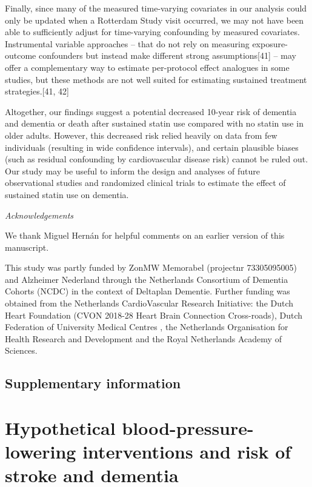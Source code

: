 \documentclass[
]{book}
\begin{document}
Finally, since many of the measured time-varying covariates in our analysis could only be
updated when a Rotterdam Study visit occurred, we may not have been able to sufficiently adjust for time-varying confounding by measured covariates. Instrumental variable approaches -- that do not rely on measuring exposure-outcome confounders but instead make different strong assumptions{[}41{]} -- may offer a complementary way to estimate per-protocol effect analogues in some studies, but these methods are not well suited for estimating sustained treatment strategies.{[}41, 42{]}

Altogether, our findings suggest a potential decreased 10-year risk of dementia and dementia or death after sustained statin use compared with no statin use in older adults. However, this decreased risk relied heavily on data from few individuals (resulting in wide confidence intervals), and certain plausible biases (such as residual confounding by cardiovascular disease risk) cannot be ruled out. Our study may be useful to inform the design and analyses of future observational studies and randomized clinical trials to estimate the effect of sustained statin use on dementia.

\emph{Acknowledgements}

We thank Miguel Hernán for helpful comments on an earlier version of this manuscript.

This study was partly funded by ZonMW Memorabel (projectnr 73305095005) and Alzheimer Nederland through the Netherlands Consortium of Dementia Cohorts (NCDC) in the context of Deltaplan Dementie. Further funding was obtained from the Netherlands CardioVascular Research Initiative: the Dutch Heart Foundation (CVON 2018-28 Heart Brain Connection Cross-roads), Dutch Federation of University Medical Centres , the Netherlands Organisation for Health Research and Development and the Royal Netherlands Academy of Sciences.

\hypertarget{supplementary-information}{%
\section{Supplementary information}\label{supplementary-information}}

\hypertarget{chapter3}{%
\chapter{Hypothetical blood-pressure-lowering interventions and risk of stroke and dementia}\label{chapter3}}
\end{document}
